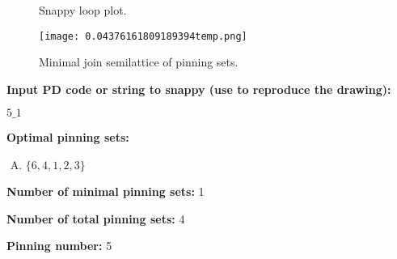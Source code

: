 \documentclass{article}%
\begin{document}
\begin{multicols}{2}
\begin{figure}[H]
\centering

\caption{Snappy loop plot.}
\label{fig:0.7229109529631879temp.svg}
\end{figure}\columnbreak

\begin{figure}[H]
\centering
\texttt{[image: 0.04376161809189394temp.png]}
\caption{Minimal join semilattice of pinning sets.}
\label{fig:0.04376161809189394temp.png}
\end{figure}\end{multicols}\newpage\begin{multicols}{2}

\columnbreak

\noindent\textbf{Input PD code or string to snappy (use to reproduce the drawing):}

	$5\_1$

\noindent\textbf{Optimal pinning sets:}

\begin{enumerate}[A)]
\item{\Huge\textcolor{green0}{\textbullet}}$\{6,4,1,2,3\}$

\end{enumerate}


\noindent\textbf{Number of minimal pinning sets:} 1

\noindent\textbf{Number of total pinning sets:} 4

\noindent\textbf{Pinning number:} 5


\end{multicols}
\end{document}
